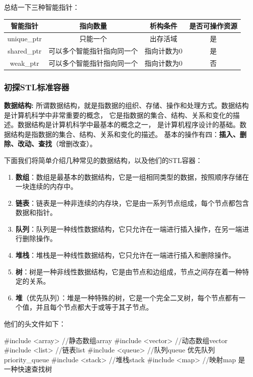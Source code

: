 总结一下三种智能指针：
\begin{center}

    \begin{tabular}{cccc}
        \hline
        智能指针 & 指向数量 & 析构条件 & 是否可操作资源\\
        \hline
        unique\_ptr & 只能一个 & 出存活域 & 是\\
        shared\_ptr & 可以多个智能指针指向同一个 & 指向计数为0 & 是\\
        weak\_ptr & 可以多个智能指针指向同一个 & 指向计数为0 & 否\\
        \hline
        
    \end{tabular}
\end{center}

\subsubsection{初探STL标准容器}
\textbf{数据结构:}
所谓数据结构，就是指数据的组织、存储、操作和处理方式。数据结构是计算机科学中非常重要的概念，
它是指数据的集合、结构、关系和变化的描述。数据结构是计算机科学中最基本的概念之一，
是计算机程序设计的基础。数据结构是指数据的集合、结构、关系和变化的描述。
基本的操作有四：\textbf{插入、删除、改动、查找}（增删改查）。


下面我们将简单介绍几种常见的数据结构，以及他们的STL容器：

\begin{enumerate}
    \item \textbf{数组}：数组是最基本的数据结构，它是一组相同类型的数据，按照顺序存储在一块连续的内存中。
    \item \textbf{链表}：链表是一种非连续的内存块，它是由一系列节点组成，每个节点都包含数据和指针。
    \item \textbf{队列}：队列是一种线性数据结构，它只允许在一端进行插入操作，在另一端进行删除操作。
    \item \textbf{堆栈}：堆栈是一种线性数据结构，它只允许在一端进行插入和删除操作。
    \item \textbf{树}：树是一种非线性数据结构，它是由节点和边组成，节点之间存在着一种特定的关系。
    \item \textbf{堆}（优先队列）：堆是一种特殊的树，它是一个完全二叉树，每个节点都有一个值，并且每个节点都大于或等于其子节点。
\end{enumerate}

他们的头文件如下：

\begin{tcode}
#include <array>    //静态数组array
#include <vector>   //动态数组vector
#include <list>     //链表list
#include <queue>    //队列queue 优先队列priority_queue
#include <stack>    //堆栈stack
#include <map>      //映射map 是一种快速查找树
\end{tcode}

